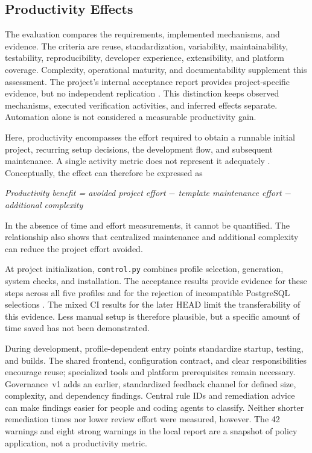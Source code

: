 \subsection{Productivity Effects}
\label{subsec:produktivitaetswirkung}

The evaluation compares the requirements, implemented mechanisms, and
evidence. The criteria are reuse, standardization, variability,
maintainability, testability, reproducibility, developer experience,
extensibility, and platform coverage. Complexity, operational maturity, and
documentability supplement this assessment. The project's internal
acceptance report provides project-specific evidence, but no independent
replication \parencite{kleiveist2026acceptance}.
This distinction keeps observed mechanisms, executed verification activities,
and inferred effects separate. Automation alone is not considered a measurable
productivity gain.

Here, productivity encompasses the effort required to obtain a runnable
initial project, recurring setup decisions, the development flow, and
subsequent maintenance. A single activity metric does not represent it
adequately \parencite{forsgren2021space}. Conceptually, the effect can
therefore be expressed as

\begin{center}
  \emph{Productivity benefit = avoided project effort
  $-$ template maintenance effort $-$ additional complexity}
\end{center}

In the absence of time and effort measurements, it cannot be quantified.
The relationship also shows that centralized maintenance and additional
complexity can reduce the project effort avoided.

At project initialization, \texttt{control.py} combines profile selection,
generation, system checks, and installation. The acceptance results provide
evidence for these steps across all five profiles and for the rejection of
incompatible PostgreSQL selections
\parencite{kleiveist2026acceptance}. The mixed CI results for the later HEAD
limit the transferability of this evidence. Less manual setup is therefore
plausible, but a specific amount of time saved has not been demonstrated.

During development, profile-dependent entry points standardize startup,
testing, and builds. The shared frontend, configuration contract, and clear
responsibilities encourage reuse; specialized tools and platform prerequisites
remain necessary. Governance~v1 adds an earlier, standardized feedback channel
for defined size, complexity, and dependency findings. Central rule IDs and
remediation advice can make findings easier for people and coding agents to
classify. Neither shorter remediation times nor lower review effort were
measured, however. The 42 warnings and eight strong warnings in the local
report are a snapshot of policy application, not a productivity metric.

